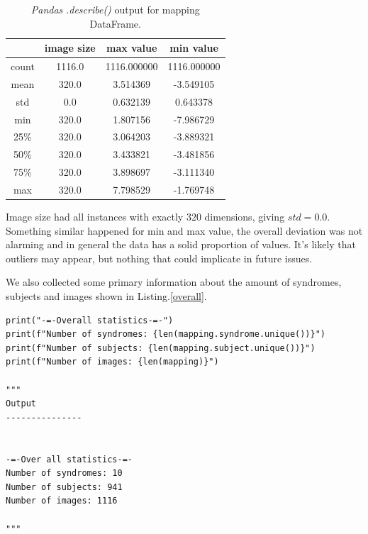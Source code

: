 \documentclass{article}
\begin{document}
\begin{table}[!h]
	\begin{center} 
		\begin{tabular}{ |c|c|c|c| } 
			\hline
			 & image size	& max value &	min value \\
			\hline
			count	& 1116.0  & 1116.000000	& 1116.000000 \\
			mean    & 320.0	  & 3.514369	& -3.549105 \\
			std	    & 0.0	  & 0.632139	& 0.643378 \\
			min	    & 320.0	  & 1.807156	& -7.986729 \\
			25\%	& 320.0	  & 3.064203	& -3.889321 \\
			50\%	& 320.0	  & 3.433821	& -3.481856 \\
			75\%	& 320.0	  & 3.898697	& -3.111340 \\
			max	    & 320.0	  & 7.798529	& -1.769748 \\
			\hline
		\end{tabular}
		\caption{\textit{Pandas} \textit{.describe()} output for mapping DataFrame.}
		\label{table-df}
	
	\end{center}
\end{table}

Image size had all instances with exactly $320$ dimensions, giving $std = 0.0$. Something similar happened for min and max value, the overall deviation was not alarming and in general the data has a solid proportion of values. It's likely that outliers may appear, but nothing that could implicate in future issues.

We also collected some primary information about the amount of syndromes, subjects and images shown in Listing.\ref{overall}.

\begin{listing}[H]
	\centering
	\begin{verbatim} 
print("-=-Overall statistics-=-")
print(f"Number of syndromes: {len(mapping.syndrome.unique())}")
print(f"Number of subjects: {len(mapping.subject.unique())}")
print(f"Number of images: {len(mapping)}")
	
"""
Output
---------------
	
	
-=-Over all statistics-=-
Number of syndromes: 10
Number of subjects: 941
Number of images: 1116
	
"""
\end{verbatim}
	
	\caption{Overall statistics for number of syndromes, subjects and images in mapping DataFrame.}
	\label{overall}
\end{listing}
\end{document}
